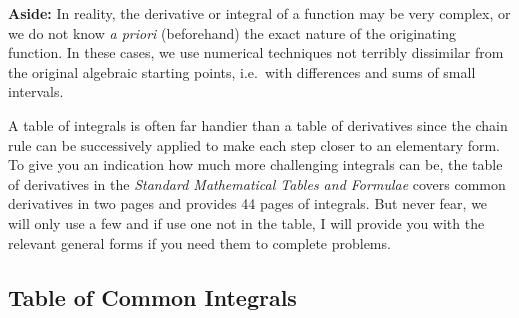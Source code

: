 \begin{framed}
    {\bf Aside:} In reality, the derivative or integral of a function may be
    very complex, or we do not know {\it a priori} (beforehand) the exact nature
    of the originating function.  In these cases, we use numerical techniques
    not terribly dissimilar from the original algebraic starting points, i.e.\
    with differences and sums of small intervals.
\end{framed}

A table of integrals is often far handier than a table of derivatives since the
chain rule can be successively applied to make each step closer to an elementary
form.  To give you an indication how much more challenging integrals can be, the
table of derivatives in the {\it Standard Mathematical Tables and Formulae}
covers common derivatives in two pages and provides 44 pages of integrals.  But
never fear, we will only use a few and if use one not in the table, I will
provide you with the relevant general forms if you need them to complete
problems.

\subsection{Table of Common Integrals}


\nocite{Zwillinger1996}


